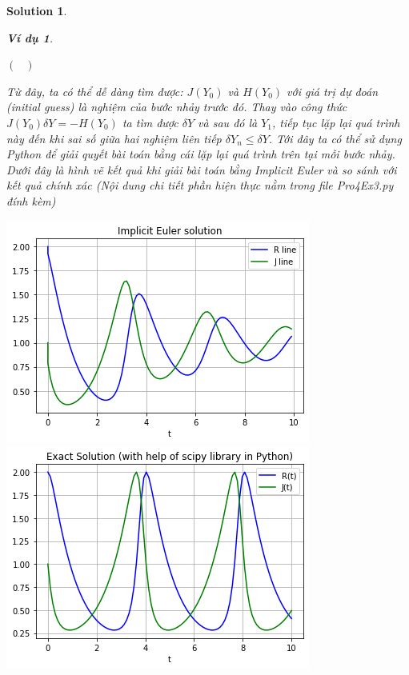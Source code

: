 \documentclass[a4paper]{article}
\newtheorem{example}{Ví dụ}
\newtheorem*{sol}{Solution}
\begin{document}
\begin{sol}
\begin{example}
\begin{center}
\begin{math}
\begin{pmatrix}
        \end{pmatrix}
    \end{math} \\
\end{center}
Từ đây, ta có thể dễ dàng tìm được: $J(Y_0)$ và $H(Y_0)$ với giá trị dự đoán (initial guess) là nghiệm của bước nhảy trước đó. Thay vào công thức $J(Y_0) \delta Y = -H(Y_0)$ ta tìm được $\delta Y$ và sau đó là $Y_1$, tiếp tục lặp lại quá trình này đến khi sai số giữa hai nghiệm liên tiếp $\delta Y_n \leq \delta Y$.
    Tới đây ta có thể sử dụng Python để giải quyết bài toán bằng cái lặp lại quá trình trên tại mỗi bước nhảy. \\
    Dưới đây là hình vẽ kết quả khi giải bài toán bằng Implicit Euler và so sánh với kết quả chính xác (Nội dung chi tiết phần hiện thực nằm trong file Pro4Ex3.py đính kèm)

    \includegraphics[width=\textwidth]{image/C4/vd3eu.png}
    \includegraphics[width=\textwidth]{image/C4/vd3ex.png}
\end{example}   



\end{sol}
\end{document}
